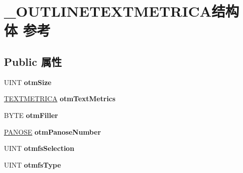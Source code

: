 \hypertarget{struct___o_u_t_l_i_n_e_t_e_x_t_m_e_t_r_i_c_a}{}\section{\+\_\+\+O\+U\+T\+L\+I\+N\+E\+T\+E\+X\+T\+M\+E\+T\+R\+I\+C\+A结构体 参考}
\label{struct___o_u_t_l_i_n_e_t_e_x_t_m_e_t_r_i_c_a}
\subsection*{Public 属性}
\begin{DoxyCompactItemize}
\item 
\mbox{\label{struct___o_u_t_l_i_n_e_t_e_x_t_m_e_t_r_i_c_a_ad9cc7cf8e8ad99eb5aeedfe0b82aa32a}} 
U\+I\+NT {\bfseries otm\+Size}
\item 
\mbox{\label{struct___o_u_t_l_i_n_e_t_e_x_t_m_e_t_r_i_c_a_ab3f0dbd34f3265ed9067f8bfdfea937a}} 
\hyperlink{structtag_t_e_x_t_m_e_t_r_i_c_a}{T\+E\+X\+T\+M\+E\+T\+R\+I\+CA} {\bfseries otm\+Text\+Metrics}
\item 
\mbox{\label{struct___o_u_t_l_i_n_e_t_e_x_t_m_e_t_r_i_c_a_adcd71013a70458e7c8ce1a0a573cce30}} 
B\+Y\+TE {\bfseries otm\+Filler}
\item 
\mbox{\label{struct___o_u_t_l_i_n_e_t_e_x_t_m_e_t_r_i_c_a_a67edbf325edcd0a76457f4ea1547d4e7}} 
\hyperlink{structtag_p_a_n_o_s_e}{P\+A\+N\+O\+SE} {\bfseries otm\+Panose\+Number}
\item 
\mbox{\label{struct___o_u_t_l_i_n_e_t_e_x_t_m_e_t_r_i_c_a_aa43683fcbedcdd2dbd2571f11d8f6655}} 
U\+I\+NT {\bfseries otmfs\+Selection}
\item 
\mbox{\label{struct___o_u_t_l_i_n_e_t_e_x_t_m_e_t_r_i_c_a_a67e1bb5bbdb39ca7a303eeaff1d7e078}} 
U\+I\+NT {\bfseries otmfs\+Type}
\item 
\mbox{\label{struct___o_u_t_l_i_n_e_t_e_x_t_m_e_t_r_i_c_a_a33e2e769b8974bcedae63b6111474115}} 

\end{DoxyCompactItemize}
